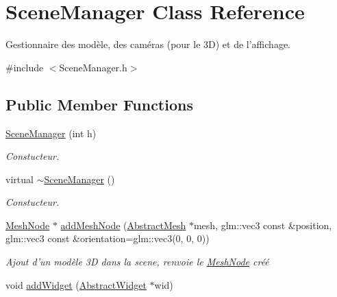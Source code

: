 \hypertarget{classSceneManager}{\section{Scene\+Manager Class Reference}
\label{classSceneManager}
}


Gestionnaire des modèle, des caméras (pour le 3\+D) et de l'affichage.  




{\ttfamily \#include $<$Scene\+Manager.\+h$>$}

\subsection*{Public Member Functions}
\begin{DoxyCompactItemize}
\item 
\hypertarget{classSceneManager_a3e4b3a27b84b69d07ed90474ec9c1a93}{\hyperlink{classSceneManager_a3e4b3a27b84b69d07ed90474ec9c1a93}{Scene\+Manager} (int h)}\label{classSceneManager_a3e4b3a27b84b69d07ed90474ec9c1a93}

\begin{DoxyCompactList}\small\item\em Constucteur. \end{DoxyCompactList}\item 
\hypertarget{classSceneManager_a2bb376a85d29e85f47753e26c7539229}{virtual \hyperlink{classSceneManager_a2bb376a85d29e85f47753e26c7539229}{$\sim$\+Scene\+Manager} ()}\label{classSceneManager_a2bb376a85d29e85f47753e26c7539229}

\begin{DoxyCompactList}\small\item\em Constucteur. \end{DoxyCompactList}\item 
\hypertarget{classSceneManager_a28285bcb48151c06270333d39800d100}{\hyperlink{classMeshNode}{Mesh\+Node} $\ast$ \hyperlink{classSceneManager_a28285bcb48151c06270333d39800d100}{add\+Mesh\+Node} (\hyperlink{classAbstractMesh}{Abstract\+Mesh} $\ast$mesh, glm\+::vec3 const \&position, glm\+::vec3 const \&orientation=glm\+::vec3(0, 0, 0))}\label{classSceneManager_a28285bcb48151c06270333d39800d100}

\begin{DoxyCompactList}\small\item\em Ajout d'un modèle 3\+D dans la scene, renvoie le \hyperlink{classMeshNode}{Mesh\+Node} créé \end{DoxyCompactList}\item 
\hypertarget{classSceneManager_a0a09312366326529be7146f5825f703e}{void \hyperlink{classSceneManager_a0a09312366326529be7146f5825f703e}{add\+Widget} (\hyperlink{classAbstractWidget}{Abstract\+Widget} $\ast$wid)}\label{classSceneManager_a0a09312366326529be7146f5825f703e}


\end{DoxyCompactItemize}
